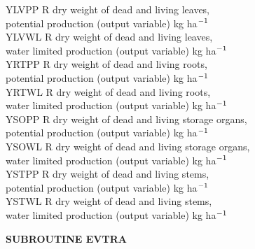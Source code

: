 \documentclass[11pt]{article}
\begin{document}
\begin{tabbing}
YLVPP\> \> R\> dry weight of dead and living leaves, \\
\>\> \> potential production (output variable)\> \> \> \> \> \> \> kg ha$^{{\rm -1}}$\\
YLVWL\> \> R\> dry weight of dead and living leaves, \\
\>\> \> water limited production (output variable)\> \> \> \> \> \> \> kg ha$^{{\rm -1}}$\\
YRTPP\> \> R\> dry weight of dead and living roots, \\
\>\> \> potential production (output variable)\> \> \> \> \> \> \> kg ha$^{{\rm -1}}$\\
YRTWL\> \> R\> dry weight of dead and living roots, \\
\>\> \> water limited production (output variable)\> \> \> \> \> \> \> kg ha$^{{\rm -1}}$\\
YSOPP\> \> R\> dry weight of dead and living storage organs,\\
\>\> \> potential production (output variable)\> \> \> \> \> \> \> kg ha$^{{\rm -1}}$\\
YSOWL\> \> R\> dry weight of dead and living storage organs, \\
\>\> \> water limited production (output variable)\> \> \> \> \> \> \> kg ha$^{{\rm -1}}$\\
YSTPP\> \> R\> dry weight of dead and living stems,\\
\>\> \> potential production (output variable)\> \> \> \> \> \> \> kg ha$^{{\rm -1}}$\\
YSTWL\> \> R\> dry weight of dead and living stems, \\
\>\> \> water limited production (output variable)\> \> \> \> \> \> \> kg ha$^{{\rm -1}}$
\end{tabbing}

\bigskip
\bigskip
\bigskip
\bigskip
{\bf SUBROUTINE EVTRA}
\testlastline
\end{document}

